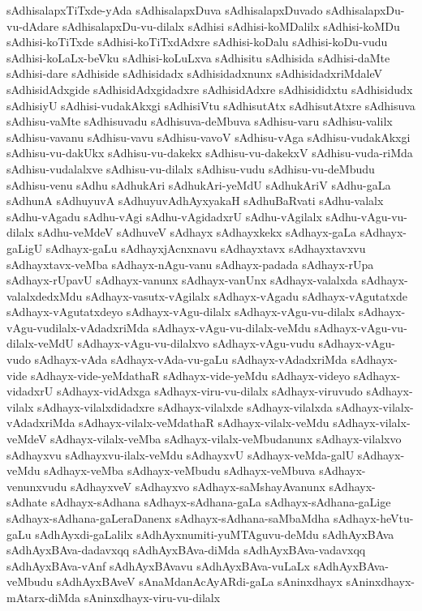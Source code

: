 {sAdhisalapxTiTxde-yAda
sAdhisalapxDuva
sAdhisalapxDuvado
sAdhisalapxDu-vu-dAdare
sAdhisalapxDu-vu-dilalx
sAdhisi
sAdhisi-koMDalilx
sAdhisi-koMDu
sAdhisi-koTiTxde
sAdhisi-koTiTxdAdxre
sAdhisi-koDalu
sAdhisi-koDu-vudu
sAdhisi-koLaLx-beVku
sAdhisi-koLuLxva
sAdhisitu
sAdhisida
sAdhisi-daMte
sAdhisi-dare
sAdhiside
sAdhisidadx
sAdhisidadxnunx
sAdhisidadxriMdaleV
sAdhisidAdxgide
sAdhisidAdxgidadxre
sAdhisidAdxre
sAdhisididxtu
sAdhisidudx
sAdhisiyU
sAdhisi-vudakAkxgi
sAdhisiVtu
sAdhisutAtx
sAdhisutAtxre
sAdhisuva
sAdhisu-vaMte
sAdhisuvadu
sAdhisuva-deMbuva
sAdhisu-varu
sAdhisu-valilx
sAdhisu-vavanu
sAdhisu-vavu
sAdhisu-vavoV
sAdhisu-vAga
sAdhisu-vudakAkxgi
sAdhisu-vu-dakUkx
sAdhisu-vu-dakekx
sAdhisu-vu-dakekxV
sAdhisu-vuda-riMda
sAdhisu-vudalalxve
sAdhisu-vu-dilalx
sAdhisu-vudu
sAdhisu-vu-deMbudu
sAdhisu-venu
sAdhu
sAdhukAri
sAdhukAri-yeMdU
sAdhukAriV
sAdhu-gaLa
sAdhunA
sAdhuyuvA
sAdhuyuvAdhAyxyakaH
sAdhuBaRvati
sAdhu-valalx
sAdhu-vAgadu
sAdhu-vAgi
sAdhu-vAgidadxrU
sAdhu-vAgilalx
sAdhu-vAgu-vu-dilalx
sAdhu-veMdeV
sAdhuveV
sAdhayx
sAdhayxkekx
sAdhayx-gaLa
sAdhayx-gaLigU
sAdhayx-gaLu
sAdhayxjAcnxnavu
sAdhayxtavx
sAdhayxtavxvu
sAdhayxtavx-veMba
sAdhayx-nAgu-vanu
sAdhayx-padada
sAdhayx-rUpa
sAdhayx-rUpavU
sAdhayx-vanunx
sAdhayx-vanUnx
sAdhayx-valalxda
sAdhayx-valalxdedxMdu
sAdhayx-vasutx-vAgilalx
sAdhayx-vAgadu
sAdhayx-vAgutatxde
sAdhayx-vAgutatxdeyo
sAdhayx-vAgu-dilalx
sAdhayx-vAgu-vu-dilalx
sAdhayx-vAgu-vudilalx-vAdadxriMda
sAdhayx-vAgu-vu-dilalx-veMdu
sAdhayx-vAgu-vu-dilalx-veMdU
sAdhayx-vAgu-vu-dilalxvo
sAdhayx-vAgu-vudu
sAdhayx-vAgu-vudo
sAdhayx-vAda
sAdhayx-vAda-vu-gaLu
sAdhayx-vAdadxriMda
sAdhayx-vide
sAdhayx-vide-yeMdathaR
sAdhayx-vide-yeMdu
sAdhayx-videyo
sAdhayx-vidadxrU
sAdhayx-vidAdxga
sAdhayx-viru-vu-dilalx
sAdhayx-viruvudo
sAdhayx-vilalx
sAdhayx-vilalxdidadxre
sAdhayx-vilalxde
sAdhayx-vilalxda
sAdhayx-vilalx-vAdadxriMda
sAdhayx-vilalx-veMdathaR
sAdhayx-vilalx-veMdu
sAdhayx-vilalx-veMdeV
sAdhayx-vilalx-veMba
sAdhayx-vilalx-veMbudanunx
sAdhayx-vilalxvo
sAdhayxvu
sAdhayxvu-ilalx-veMdu
sAdhayxvU
sAdhayx-veMda-galU
sAdhayx-veMdu
sAdhayx-veMba
sAdhayx-veMbudu
sAdhayx-veMbuva
sAdhayx-venunxvudu
sAdhayxveV
sAdhayxvo
sAdhayx-saMshayAvanunx
sAdhayx-sAdhate
sAdhayx-sAdhana
sAdhayx-sAdhana-gaLa
sAdhayx-sAdhana-gaLige
sAdhayx-sAdhana-gaLeraDanenx
sAdhayx-sAdhana-saMbaMdha
sAdhayx-heVtu-gaLu
sAdhAyxdi-gaLalilx
sAdhAyxnumiti-yuMTAguvu-deMdu
sAdhAyxBAva
sAdhAyxBAva-dadavxqq
sAdhAyxBAva-diMda
sAdhAyxBAva-vadavxqq
sAdhAyxBAva-vAnf
sAdhAyxBAvavu
sAdhAyxBAva-vuLaLx
sAdhAyxBAva-veMbudu
sAdhAyxBAveV
sAnaMdanAcAyARdi-gaLa
sAninxdhayx
sAninxdhayx-mAtarx-diMda
sAninxdhayx-viru-vu-dilalx
}
